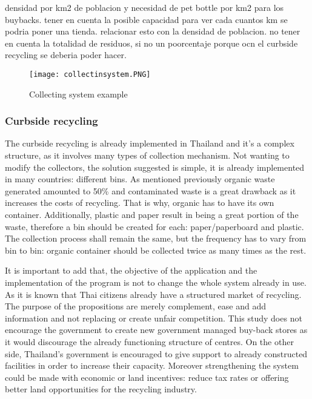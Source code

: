 \documentclass[twoside,a4paper,12pt]{report}
\begin{document}
densidad por km2 de poblacion y necesidad de pet bottle por km2  para los buybacks. tener en cuenta la posible capacidad para ver cada cuantos km se podria poner una tienda. relacionar esto con la densidad de poblacion. no tener en cuenta la totalidad de residuos, si no un poorcentaje porque ocn el curbside recycling se deberia poder hacer.


\begin{figure}
    \centering
    \texttt{[image: collectinsystem.PNG]}
    \caption{Collecting system example}
     \label{collectingsystem} 
\end{figure}

\subsubsection{Curbside recycling}

The curbside recycling is already implemented in Thailand and it's a complex structure, as it involves many types of collection mechanism. Not wanting to modify the collectors, the solution suggested is simple, it is already implemented in many countries: different bins. As mentioned previously organic waste generated amounted to 50\% and contaminated waste is a great drawback as it increases the costs of recycling. That is why, organic has to have its own container. Additionally, plastic and paper result in being a great portion of the waste, therefore a bin should be created for each: paper/paperboard and plastic. The collection process shall remain the same, but the frequency has to vary from bin to bin: organic container should be collected twice as many times as the rest.

It is important to add that, the objective of the application and the implementation of the program is not to change the whole system already in use. As it is known that Thai citizens already have a structured market of recycling. The purpose of the propositions are merely complement, ease and add information and not replacing or create unfair competition. This study does not encourage the government to create new government managed buy-back stores as it would discourage the already functioning structure of centres. On the other side, Thailand's government is encouraged to give support to already constructed facilities in order to increase their capacity. Moreover strengthening the system could be made with economic or land incentives: reduce tax rates or offering better land opportunities for the recycling industry. 
\end{document}
